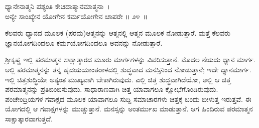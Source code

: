 \begin{shloka}
ಧ್ಯಾನೇನಾತ್ಮನಿ ಪಶ್ಯಂತಿ ಕೇಚಿದಾತ್ಮಾನಮಾತ್ಮನಾ~।\\ಅನ್ಯೇ ಸಾಂಖ್ಯೇನ ಯೋಗೇನ ಕರ್ಮಯೋಗೇನ ಚಾಪರೇ \hfill॥ ೨೪~॥
\end{shloka}

\begin{artha}
ಕೆಲವರು ಧ್ಯಾನದ ಮೂಲಕ (ಪರಮ)ಆತ್ಮನನ್ನು ಆತ್ಮನಲ್ಲಿ ಆತ್ಮನ ಮೂಲಕ ನೋಡುತ್ತಾರೆ. ಮತ್ತೆ ಕೆಲವರು ಜ್ಞಾನಯೋಗದಿಂದಲೂ ಕರ್ಮಯೋಗದಿಂದಲೂ ಅವನನ್ನು ನೋಡುತ್ತಾರೆ.
\end{artha}

ಶ‍್ರೀಕೃಷ್ಣ ಇಲ್ಲಿ ಪರಮಾತ್ಮನ ಸಾಕ್ಷಾತ್ಕಾರದ ಮೂರು ಮಾರ್ಗಗಳನ್ನು ವಿವರಿಸುತ್ತಾನೆ. ಮೊದಲ ನೆಯದು ಧ್ಯಾನ ಮಾರ್ಗ. ಅಲ್ಲಿ ಪರಮಾತ್ಮನನ್ನು ತನ್ನ ಹೃದಯಯಾಂತರಾಳದಲ್ಲಿ ಶುದ್ಧವಾದ ಮನಸ್ಸಿನಿಂದ ನೋಡುತ್ತಾನೆ; ಇದೇ ಧ್ಯಾನಮಾರ್ಗ. ಇಲ್ಲಿ ಚಿತ್ತಶುದ್ಧಿಯೇ ಅತ್ಯಂತ ಮುಖ್ಯವಾಗಿ ಬೇಕಾಗಿರುವುದು. ಎಲ್ಲಿ ಚಿತ್ತ ಶುದ್ಧವಾಗಿದೆಯೋ, ಅಲ್ಲಿ ಆ ಚಿತ್ತ ಪರಮಾತ್ಮನನ್ನು ಪ್ರತಿಬಿಂಬಿಸುವುದು. ಸಾಧಾರಾಣವಾಗಿ ಚಿತ್ತ ಯಾವಾಗಲೂ ಕ್ಷೋಭೆಗೊಂಡಿರುವುದು. ಪಂಚೇಂದ್ರಿಯಗಳ ಗವಾಕ್ಷದ ಮೂಲಕ ಯಾವಾಗಲೂ ಸುದ್ದಿ ಸಮಾಚಾರಗಳು ಚಿತ್ತಕ್ಕೆ ಬಂದು ಬೀಳುತ್ತ ಇರುತ್ತವೆ. ಈ ಯೋಗದಲ್ಲಿ ಆ ಗವಾಕ್ಷಗಳನ್ನು ಮುಚ್ಚುತ್ತಾನೆ. ಮನಸ್ಸನ್ನು ಅಂತರ್ಮುಖ ಮಾಡುತ್ತಾನೆ. ಆಗ ಹಿಂದಿರುವ ಪರಮಾತ್ಮನ ಸಾಕ್ಷಾತ್ಕಾರವಾಗುತ್ತದೆ.

